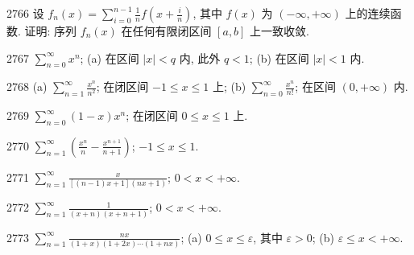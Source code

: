 \begin{prob}[M]{2766}
设 $f_n(x) = \sum_{i=0}^{n-1} \frac{1}{n} f\left(x+\frac{i}{n}\right)$, 其中 $f(x)$ 为 $(-\infty, +\infty)$ 上的连续函数. 证明: 序列 $f_n(x)$ 在任何有限闭区间 $[a,b]$ 上一致收敛.
\end{prob}


\begin{prob}[M]{2767}
$\sum_{n=0}^{\infty} x^n$; (a) 在区间 $|x| < q$ 内, 此外 $q < 1$; \qquad (b) 在区间 $|x| < 1$ 内.
\end{prob}

\begin{prob}[M]{2768}
(a) $\sum_{n=1}^{\infty} \frac{x^n}{n^2}$; 在闭区间 $-1 \leqslant x \leqslant 1$ 上; \qquad (b) $\sum_{n=0}^{\infty} \frac{x^n}{n!}$; 在区间 $(0, +\infty)$ 内.
\end{prob}

\begin{prob}[S]{2769}
$\sum_{n=0}^{\infty} (1-x)x^n$; 在闭区间 $0 \leqslant x \leqslant 1$ 上.
\end{prob}

\begin{prob}[S]{2770}
$\sum_{n=1}^{\infty} \left(\frac{x^n}{n} - \frac{x^{n+1}}{n+1}\right)$; $-1 \leqslant x \leqslant 1$.
\end{prob}

\begin{prob}[S]{2771}
$\sum_{n=1}^{\infty} \frac{x}{[(n-1)x+1](nx+1)}$; $0 < x < +\infty$.
\end{prob}

\begin{prob}[S]{2772}
$\sum_{n=1}^{\infty} \frac{1}{(x+n)(x+n+1)}$; $0 < x < +\infty$.
\end{prob}

\begin{prob}[M]{2773}
$\sum_{n=1}^{\infty} \frac{nx}{(1+x)(1+2x)\cdots (1+nx)}$; (a) $0 \leqslant x \leqslant \varepsilon$, 其中 $\varepsilon > 0$; \qquad (b) $\varepsilon \leqslant x < +\infty$.
\end{prob}

